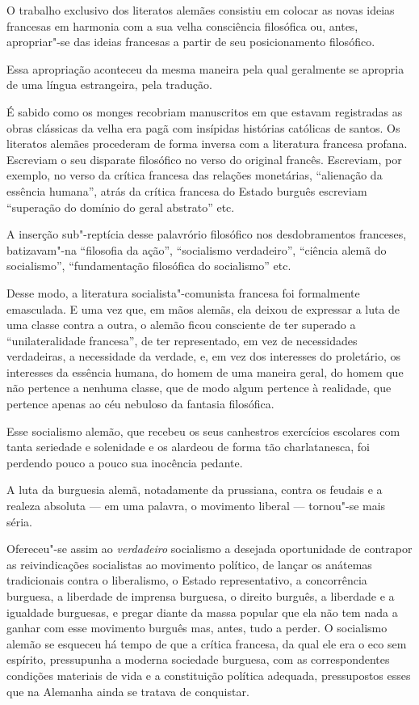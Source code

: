 O trabalho exclusivo dos literatos alemães consistiu em colocar as novas
ideias francesas em harmonia com a sua velha consciência filosófica ou,
antes, apropriar"-se das ideias francesas a partir de seu
posicionamento filosófico.

Essa apropriação aconteceu da mesma maneira pela qual geralmente se
apropria de uma língua estrangeira, pela tradução.

É sabido como os monges recobriam manuscritos em que estavam registradas
as obras clássicas da velha era pagã com insípidas histórias católicas
de santos. Os literatos alemães procederam de forma inversa com a
literatura francesa profana. Escreviam o seu disparate filosófico no
verso do original francês. Escreviam, por exemplo, no verso da crítica
francesa das relações monetárias, ``alienação da essência humana'', atrás
da crítica francesa do Estado burguês escreviam ``superação do domínio
do geral abstrato'' etc.

A inserção sub"-reptícia desse palavrório filosófico nos desdobramentos
franceses, batizavam"-na ``filosofia da ação'', ``socialismo verdadeiro'',
``ciência alemã do socialismo'', ``fundamentação filosófica do socialismo''
etc.

Desse modo, a literatura socialista"-comunista francesa foi formalmente
emasculada. E uma vez que, em mãos alemãs, ela deixou de expressar a
luta de uma classe contra a outra, o alemão ficou consciente de ter
superado a ``unilateralidade francesa'', de ter representado, em vez de
necessidades verdadeiras, a necessidade da verdade, e, em vez dos
interesses do proletário, os interesses da essência humana, do homem de
uma maneira geral, do homem que não pertence a nenhuma classe, que de
modo algum pertence à realidade, que pertence apenas ao céu nebuloso da
fantasia filosófica.

Esse socialismo alemão, que recebeu os seus canhestros exercícios
escolares com tanta seriedade e solenidade e os alardeou de forma tão
charlatanesca, foi perdendo pouco a pouco sua inocência pedante.

A luta da burguesia alemã, notadamente da prussiana, contra os feudais e
a realeza absoluta  ---  em uma palavra, o movimento liberal  ---  tornou"-se
mais séria.

Ofereceu"-se assim ao \textit{verdadeiro} socialismo a desejada oportunidade
de contrapor as reivindicações socialistas ao movimento político, de
lançar os anátemas tradicionais contra o liberalismo, o Estado
representativo, a concorrência burguesa, a liberdade de imprensa
burguesa, o direito burguês, a liberdade e a igualdade burguesas, e pregar
diante da massa popular que ela não tem nada a ganhar com esse
movimento burguês mas, antes, tudo a perder. O socialismo alemão se
esqueceu há tempo de que a crítica francesa, da qual ele era o eco sem
espírito, pressupunha a moderna sociedade burguesa, com as
correspondentes condições materiais de vida e a constituição política
adequada, pressupostos esses que na Alemanha ainda se tratava de
conquistar.

